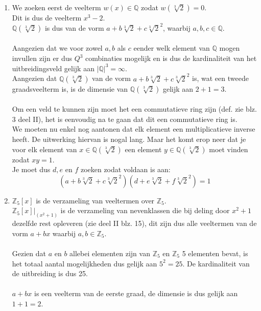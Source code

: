 \documentclass[11pt,a4paper,titlepage]{article}
\begin{document}
\begin{enumerate}[label=(\alph*)]
	\item We zoeken eerst de veelterm $w(x) \in \mathbb{Q}$ zodat $w(\sqrt[3]{2}) = 0$.\\ Dit is dus de veelterm $x^3-2$. \\
		$\mathbb{Q}(\sqrt[3]{2})$ is dus van de vorm $a + b \sqrt[3]{2} + c \sqrt[3]{2}^2$, waarbij $a,b,c \in \mathbb{Q}$.\\ \\
		Aangezien dat we voor zowel $a,b$ als $c$ eender welk element van $\mathbb{Q}$ mogen invullen zijn er dus $Q^3$ combinaties mogelijk en is dus de kardinaliteit van het uitbreidingsveld gelijk aan $|\mathbb{Q}|^3 = \infty$.\\
		Aangezien dat $\mathbb{Q}(\sqrt[3]{2})$ van de vorm $a + b \sqrt[3]{2} + c \sqrt[3]{2}^2$ is, wat een tweede graadsveelterm is, is de dimensie van $\mathbb{Q}(\sqrt[3]{2})$ gelijk aan $2+1 = 3$. \\ \\
		Om een veld te kunnen zijn moet het een commutatieve ring zijn (def. zie blz. 3 deel II), het is eenvoudig na te gaan dat dit een commutatieve ring is.\\
		We moeten nu enkel nog aantonen dat elk element een multiplicatieve inverse heeft. De uitwerking hiervan is nogal lang. Maar het komt erop neer dat je voor elk element van $x \in \mathbb{Q}(\sqrt[3]{2})$ een element $y \in \mathbb{Q}(\sqrt[3]{2})$ moet vinden zodat $xy = 1$.\\ Je moet dus $d,e$ en $f$ zoeken zodat voldaan is aan:
		$$(a + b \sqrt[3]{2} + c \sqrt[3]{2}^2)(d + e \sqrt[3]{2} + f \sqrt[3]{2}^2) = 1$$
	\item $\mathbb{Z}_5[x]$ is de verzameling van veeltermen over $\mathbb{Z}_5$.\\ $\mathbb{Z}_5[x]|_{(x^2+1)}$ is de verzameling van nevenklassen die bij deling door $x^2+1$ dezelfde rest opleveren (zie deel II blz. 15), dit zijn dus alle veeltermen van de vorm $a + bx$ waarbij $a,b \in \mathbb{Z}_5$. \\ \\
		Gezien dat $a$ en $b$ allebei elementen zijn van $\mathbb{Z}_5$ en $\mathbb{Z}_5$ 5 elementen bevat, is het totaal aantal mogelijkheden dus gelijk aan $5^2 = 25$. De kardinaliteit van de uitbreiding is dus 25.\\ \\
		$a + bx$ is een veelterm van de eerste graad, de dimensie is dus gelijk aan $1 + 1 = 2$. \\ \\

\end{enumerate}
\end{document}
